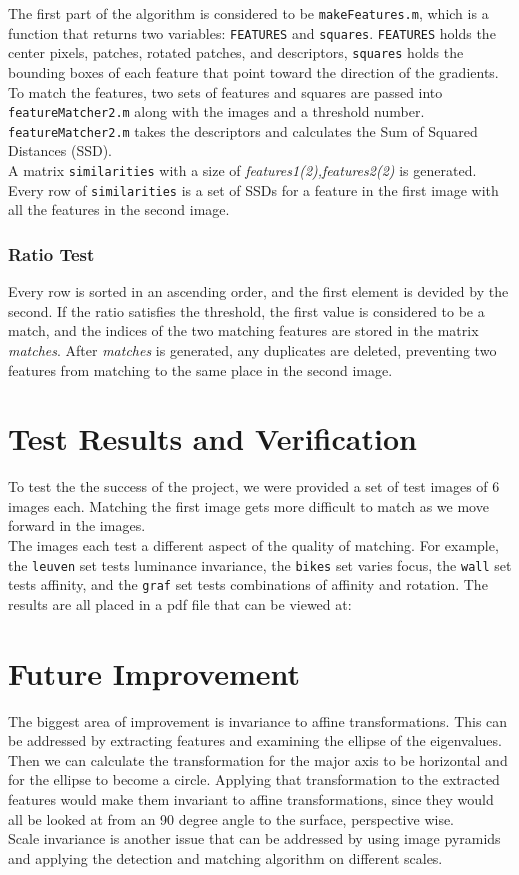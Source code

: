 \documentclass[10pt,twocolumn,letterpaper]{article}
\begin{document}
The first part of the algorithm is considered to be \texttt{makeFeatures.m}, which is a function that returns two variables: \texttt{FEATURES} and \texttt{squares}. \texttt{FEATURES} holds the center pixels, patches, rotated patches, and descriptors, \texttt{squares} holds the bounding boxes of each feature that point toward the direction of the gradients.\\
To match the features, two sets of features and squares are passed into \texttt{featureMatcher2.m} along with the images and a threshold number. \texttt{featureMatcher2.m} takes the descriptors and calculates the Sum of Squared Distances (SSD).\\
A matrix \texttt{similarities} with a size of \emph{features1(2),features2(2)} is generated. Every row of \texttt{similarities} is a set of SSDs for a feature in the first image with all the features in the second image.\\
\subsubsection{Ratio Test}
Every row is sorted in an ascending order, and the first element is devided by the second. If the ratio satisfies the threshold, the first value is considered to be a match, and the indices of the two matching features are stored in the matrix \emph{matches}. After \emph{matches} is generated, any duplicates are deleted, preventing two features from matching to the same place in the second image.

\section{Test Results and Verification}
To test the the success of the project, we were provided a set of test images of 6 images each. Matching the first image gets more difficult to match as we move forward in the images.\\
The images each test a different aspect of the quality of matching. For example, the \texttt{leuven} set tests luminance invariance, the \texttt{bikes} set varies focus, the \texttt{wall} set tests affinity, and the \texttt{graf} set tests combinations of affinity and rotation. The results are all placed in a pdf file that can be viewed at: 

\section{Future Improvement}
The biggest area of improvement is invariance to affine transformations. This can be addressed by extracting features and examining the ellipse of the eigenvalues. Then we can calculate the transformation for the major axis to be horizontal and for the ellipse to become a circle. Applying that transformation to the extracted features would make them invariant to affine transformations, since they would all be looked at from an 90 degree angle to the surface, perspective wise.\\
Scale invariance is another issue that can be addressed by using image pyramids and applying the detection and matching algorithm on different scales.
\end{document}
